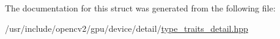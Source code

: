 The documentation for this struct was generated from the following file\-:\begin{DoxyCompactItemize}
\item 
/usr/include/opencv2/gpu/device/detail/\hyperlink{type__traits__detail_8hpp}{type\-\_\-traits\-\_\-detail.\-hpp}\end{DoxyCompactItemize}
